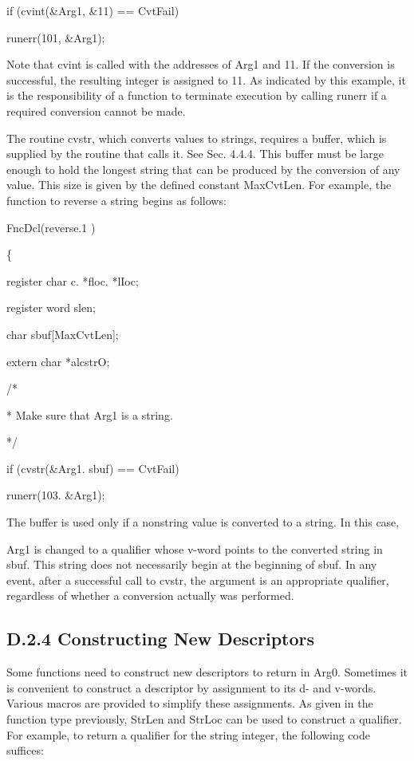 {\ttfamily\mdseries
if (cvint(\&Arg1, \&11) == CvtFail)}

{\ttfamily\mdseries
runerr(101, \&Arg1);}


Note that cvint is called with the addresses of Arg1 and 11. If the
conversion is successful, the resulting integer is assigned to 11. As
indicated by this example, it is the responsibility of a function to
terminate execution by calling runerr if a required conversion cannot
be made.

The routine cvstr, which converts values to strings, requires a
buffer, which is supplied by the routine that calls it.  See
Sec. 4.4.4. This buffer must be large enough to hold the longest
string that can be produced by the conversion of any value. This size
is given by the defined constant MaxCvtLen. For example, the function
to reverse a string begins as follows:

{\ttfamily\mdseries
FncDcl(reverse.1 )}

{\ttfamily\mdseries
\{}

{\ttfamily\mdseries
register char c. *floc. *lIoc;}

{\ttfamily\mdseries
register word slen;}

{\ttfamily\mdseries
char sbuf[MaxCvtLen];}

{\ttfamily\mdseries
extern char *alcstrO;}

{\ttfamily\mdseries
/*}

{\ttfamily\mdseries
* Make sure that Arg1 is a string.}

{\ttfamily\mdseries
*/}

{\ttfamily\mdseries
if (cvstr(\&Arg1. sbuf) == CvtFail)}

{\ttfamily\mdseries
runerr(103. \&Arg1);}

The buffer is used only if a nonstring value is converted to a
string. In this case,

Arg1 is changed to a qualifier whose v-word points to the converted
string in sbuf. This string does not necessarily begin at the
beginning of sbuf. In any event, after a successful call to cvstr, the
argument is an appropriate qualifier, regardless of whether a
conversion actually was performed.

\subsection{D.2.4 Constructing New Descriptors}

Some functions need to construct new descriptors to return in
Arg0. Sometimes it is convenient to construct a descriptor by
assignment to its d- and v-words. Various macros are provided to
simplify these assignments. As given in the function type previously,
StrLen and StrLoc can be used to construct a qualifier. For example,
to return a qualifier for the string
{\textquotedbl}integer{\textquotedbl}, the following code suffices:

